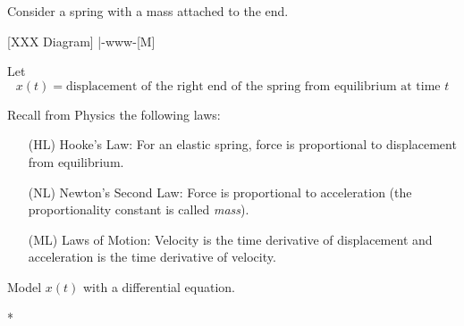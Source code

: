\documentclass{workbook}
\begin{document}
%
%

\begin{slide}
	Consider a spring with a mass attached to the end.
	
	[XXX Diagram] |-www-[M]
	
	Let
	\[
		x(t) = \text{displacement of the right end of the spring from equilibrium at time $t$}
	\]
	
	Recall from Physics the following laws:
	\begin{itemize}
		\item[(HL)] Hooke's Law: For an elastic spring, force is proportional to displacement from equilibrium. 
		\item[(NL)] Newton's Second Law: Force is proportional to acceleration (the proportionality constant is called \emph{mass}).
		\item[(ML)] Laws of Motion: Velocity is the time derivative of displacement and acceleration is the time derivative of velocity.
	\end{itemize}

	\begin{parts}
		\item Model $x(t)$ with a differential equation.

	\end{parts}
\end{slide}




\begin{bookonly}
%
%
%	
%	
%
%
%
%
	\begin{indices}*

		\printindex[symbols]

		\bigskip
		\printindex

		\bigskip
		\printindex[definitions]
	\end{indices}
\end{bookonly}
\end{document}
